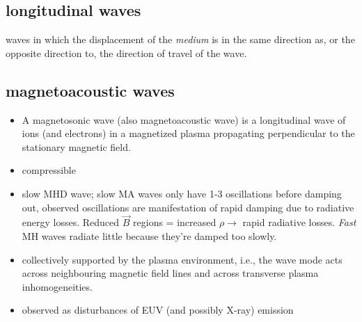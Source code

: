 \documentclass{article}
\begin{document}
\subsection{longitudinal waves}
waves in which the displacement of the \emph{medium} is in the
same direction as, or the opposite direction to,
the direction of travel of the wave.

\subsection{magnetoacoustic waves}
\begin{itemize}
    \item A magnetosonic wave (also magnetoacoustic wave) is a
        longitudinal wave of ions (and electrons) in a magnetized
        plasma propagating perpendicular to the stationary magnetic field.
    \item compressible
    \item slow MHD wave; slow MA waves only have 1-3 oscillations before
        damping out, observed oscillations are manifestation of rapid
        damping due to radiative energy losses. Reduced $\vec{B}$ regions
        = increased $\rho\rightarrow$ rapid radiative losses. \emph{Fast}
        MH waves radiate little because they're damped too slowly.
    \item collectively supported by the plasma environment, i.e., the wave mode acts
        across neighbouring magnetic field lines and across transverse
        plasma inhomogeneities.
    \item observed as disturbances of EUV (and possibly X-ray) emission
\end{itemize}
\end{document}
